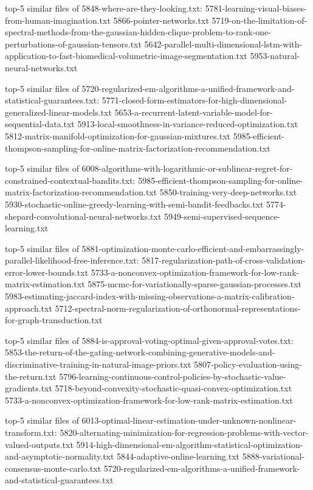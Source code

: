 \documentclass[11pt]{article}
\begin{document}
top-5 similar files of 5848-where-are-they-looking.txt:
5781-learning-visual-biases-from-human-imagination.txt
5866-pointer-networks.txt
5719-on-the-limitation-of-spectral-methods-from-the-gaussian-hidden-clique-problem-to-rank-one-perturbations-of-gaussian-tensors.txt
5642-parallel-multi-dimensional-lstm-with-application-to-fast-biomedical-volumetric-image-segmentation.txt
5953-natural-neural-networks.txt

top-5 similar files of
5720-regularized-em-algorithms-a-unified-framework-and-statistical-guarantees.txt:
5771-closed-form-estimators-for-high-dimensional-generalized-linear-models.txt
5653-a-recurrent-latent-variable-model-for-sequential-data.txt
5913-local-smoothness-in-variance-reduced-optimization.txt
5812-matrix-manifold-optimization-for-gaussian-mixtures.txt
5985-efficient-thompson-sampling-for-online-matrix-factorization-recommendation.txt

top-5 similar files of
6008-algorithms-with-logarithmic-or-sublinear-regret-for-constrained-contextual-bandits.txt:
5985-efficient-thompson-sampling-for-online-matrix-factorization-recommendation.txt
5850-training-very-deep-networks.txt
5930-stochastic-online-greedy-learning-with-semi-bandit-feedbacks.txt
5774-shepard-convolutional-neural-networks.txt
5949-semi-supervised-sequence-learning.txt

top-5 similar files of
5881-optimization-monte-carlo-efficient-and-embarrassingly-parallel-likelihood-free-inference.txt:
5817-regularization-path-of-cross-validation-error-lower-bounds.txt
5733-a-nonconvex-optimization-framework-for-low-rank-matrix-estimation.txt
5875-mcmc-for-variationally-sparse-gaussian-processes.txt
5983-estimating-jaccard-index-with-missing-observations-a-matrix-calibration-approach.txt
5712-spectral-norm-regularization-of-orthonormal-representations-for-graph-transduction.txt

top-5 similar files of
5884-is-approval-voting-optimal-given-approval-votes.txt:
5853-the-return-of-the-gating-network-combining-generative-models-and-discriminative-training-in-natural-image-priors.txt
5807-policy-evaluation-using-the-return.txt
5796-learning-continuous-control-policies-by-stochastic-value-gradients.txt
5718-beyond-convexity-stochastic-quasi-convex-optimization.txt
5733-a-nonconvex-optimization-framework-for-low-rank-matrix-estimation.txt

top-5 similar files of
6013-optimal-linear-estimation-under-unknown-nonlinear-transform.txt:
5820-alternating-minimization-for-regression-problems-with-vector-valued-outputs.txt
5914-high-dimensional-em-algorithm-statistical-optimization-and-asymptotic-normality.txt
5844-adaptive-online-learning.txt
5888-variational-consensus-monte-carlo.txt
5720-regularized-em-algorithms-a-unified-framework-and-statistical-guarantees.txt
\end{document}
